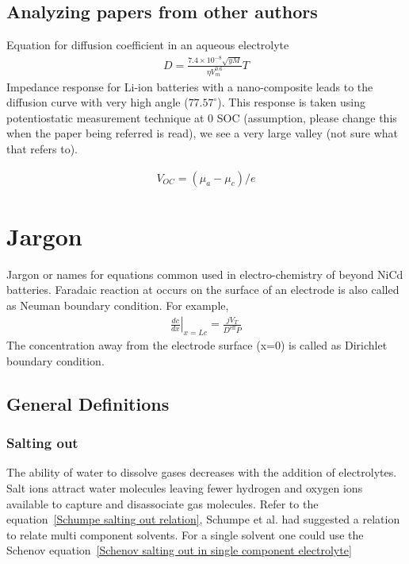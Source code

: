\documentclass[12pt]{book}
\begin{document}
\section{Analyzing papers from other authors}
Equation for diffusion coefficient in an aqueous electrolyte
\begin{align}
D=\frac{7.4\times 10^{-8}\sqrt{yM}}{\eta V_m^{0.6}}T  
\end{align}
Impedance response for Li-ion batteries with a nano-composite leads to the diffusion curve with very high angle ($77.57^\circ$). This response is taken using potentiostatic measurement technique at 0 SOC (assumption, please change this when the paper being referred is read), we see a very large valley (not sure what that refers to).


\begin{align}
V_{OC}=\left(\mu_a-\mu_c\right)/e
\end{align}


\chapter{Jargon}
Jargon or names for equations common used in electro-chemistry of beyond NiCd batteries.
Faradaic reaction at occurs on the surface of an electrode is also called as Neuman boundary condition. For example,
\begin{align}
\left.\frac{dc}{dx}\right|_{x=Lc} = \frac{jV_T}{D^{\textrm{eff}}P}
\end{align}
The concentration away from the electrode surface (x=0) is called as Dirichlet boundary condition\cite{Suwanwarangkul2003}.

\section{General Definitions}

\subsection{Salting out}
The ability of water to dissolve gases decreases with the addition of electrolytes. Salt ions attract water molecules leaving fewer hydrogen and oxygen ions available to capture and disassociate gas molecules. 
Refer to the equation~\ref{Schumpe salting out relation}, Schumpe et al. had suggested a relation to relate multi component solvents. For a single solvent one could use the Schenov equation~\ref{Schenov salting out in single component electrolyte}
\end{document}
